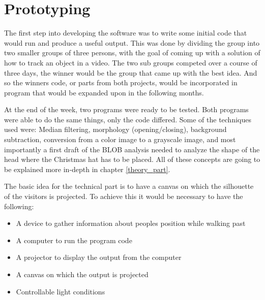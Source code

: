 
\section{Prototyping}
The first step into developing the software was to write some initial code that would run and produce a useful output. This was done by dividing the group into two smaller groups of three persons, with the goal of coming up with a solution of how to track an object in a video. The two sub groups competed over a course of three days, the winner would be the group that came up with the best idea. And so the winners code, or parts from both projects, would be incorporated in program that would be expanded upon in the following months.

At the end of the week, two programs were ready to be tested. Both programs were able to do the same things, only the code differed. Some of the techniques used were: Median filtering, morphology (opening/closing), background subtraction, conversion from a color image to a grayscale image, and most importantly a first draft of the BLOB analysis needed to analyze the shape of the head where the Christmas hat has to be placed. All of these concepts are going to be explained more in-depth in chapter \ref{theory_part}.

The basic idea for the technical part is to have a canvas on which the silhouette of the visitors is projected. To achieve this it would be necessary to have the following:


\begin{itemize}
\item A device to gather information about peoples position while walking past
\item A computer to run the program code
\item A projector to display the output from the computer
\item A canvas on which the output is projected
\item Controllable light conditions
\end{itemize}

